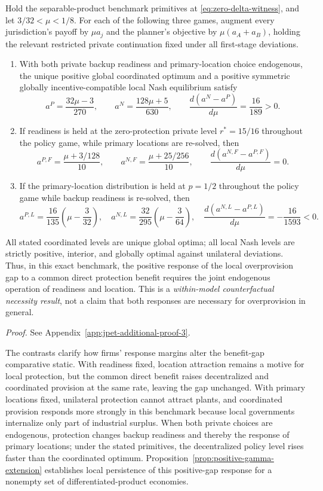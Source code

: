 \begin{proposition}
\label{prop:benefit-gap-response-interaction}
Hold the separable-product benchmark primitives at
\eqref{eq:zero-delta-witness}, and let
$3/32<\mu<1/8$. For each of the following
three games, augment every jurisdiction's payoff by
$\mu a_j$ and the planner's objective by
$\mu(a_A+a_B)$, holding the relevant restricted
private continuation fixed under all first-stage deviations.

\begin{enumerate}[label=(\roman*)]
\item With both private backup readiness and primary-location
choice endogenous, the unique positive global coordinated
optimum and a positive symmetric globally incentive-compatible
local Nash equilibrium satisfy
\[
a^P=\frac{32\mu-3}{270},\qquad
a^N=\frac{128\mu+5}{630},\qquad
\frac{d(a^N-a^P)}{d\mu}=\frac{16}{189}>0.
\]
\item If readiness is held at the zero-protection
private level $r^*=15/16$ throughout the policy game,
while primary locations are re-solved, then
\[
a^{P,F}=\frac{\mu+3/128}{10},\qquad
a^{N,F}=\frac{\mu+25/256}{10},\qquad
\frac{d(a^{N,F}-a^{P,F})}{d\mu}=0.
\]
\item If the primary-location distribution is held at
$p=1/2$ throughout the policy game while backup
readiness is re-solved, then
\[
a^{P,L}=\frac{16}{135}\left(\mu-\frac3{32}\right),
\quad
a^{N,L}=\frac{32}{295}\left(\mu-\frac3{64}\right),
\quad
\frac{d(a^{N,L}-a^{P,L})}{d\mu}
=-\frac{16}{1593}<0.
\]
\end{enumerate}

All stated coordinated levels are unique global optima;
all local Nash levels are strictly positive, interior,
and globally optimal against unilateral deviations.
Thus, in this exact benchmark, the positive response of
the local overprovision gap to a common direct protection
benefit requires the joint endogenous operation of
readiness and location. This is a \emph{within-model
counterfactual necessity result}, not a claim that both
responses are necessary for overprovision in general.
\end{proposition}

\noindent\emph{Proof.} See Appendix~\ref{app:jpet-additional-proof-3}.

The contrasts clarify how firms' response margins
alter the benefit-gap comparative static. With
readiness fixed, location attraction remains a
motive for local protection, but the common direct
benefit raises decentralized and coordinated
provision at the same rate, leaving the gap
unchanged. With primary locations fixed,
unilateral protection cannot attract plants,
and coordinated provision responds more strongly
in this benchmark because local governments
internalize only part of industrial surplus.
When both private choices are endogenous,
protection changes backup readiness and thereby
the response of primary locations; under the
stated primitives, the decentralized policy level
rises faster than the coordinated optimum.
Proposition~\ref{prop:positive-gamma-extension}
establishes local persistence of this positive-gap
response for a nonempty set of
differentiated-product economies.


